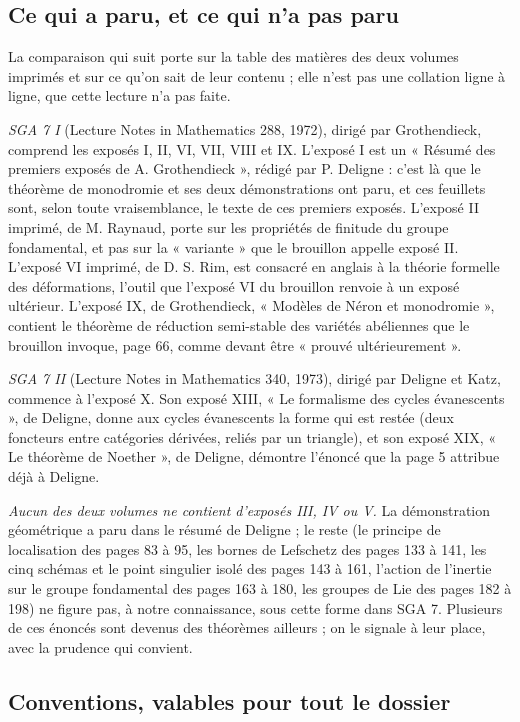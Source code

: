 \documentclass[11pt,a4paper]{article}
\begin{document}
\subsection*{Ce qui a paru, et ce qui n'a pas paru}

La comparaison qui suit porte sur la table des matières des deux volumes
imprimés et sur ce qu'on sait de leur contenu ; elle n'est pas une collation
ligne à ligne, que cette lecture n'a pas faite.

\emph{SGA 7 I} (Lecture Notes in Mathematics 288, 1972), dirigé par
Grothendieck, comprend les exposés I, II, VI, VII, VIII et IX. L'exposé I est un
« Résumé des premiers exposés de A. Grothendieck », rédigé par P. Deligne :
c'est là que le théorème de monodromie et ses deux démonstrations ont paru, et
ces feuillets sont, selon toute vraisemblance, le texte de ces premiers exposés.
L'exposé II imprimé, de M. Raynaud, porte sur les propriétés de finitude du
groupe fondamental, et pas sur la « variante » que le brouillon appelle exposé
II. L'exposé VI imprimé, de D. S. Rim, est consacré en anglais à la théorie
formelle des déformations, l'outil que l'exposé VI du brouillon renvoie à un
exposé ultérieur. L'exposé IX, de Grothendieck, « Modèles de Néron et
monodromie », contient le théorème de réduction semi-stable des variétés
abéliennes que le brouillon invoque, page 66, comme devant être « prouvé
ultérieurement ».

\emph{SGA 7 II} (Lecture Notes in Mathematics 340, 1973), dirigé par Deligne et
Katz, commence à l'exposé X. Son exposé XIII, « Le formalisme des cycles
évanescents », de Deligne, donne aux cycles évanescents la forme qui est restée
(deux foncteurs entre catégories dérivées, reliés par un triangle), et son
exposé XIX, « Le théorème de Noether », de Deligne, démontre l'énoncé que la
page 5 attribue déjà à Deligne.

\emph{Aucun des deux volumes ne contient d'exposés III, IV ou V.} La démonstration
géométrique a paru dans le résumé de Deligne ; le reste (le principe de
localisation des pages 83 à 95, les bornes de Lefschetz des pages 133 à 141, les
cinq schémas et le point singulier isolé des pages 143 à 161, l'action de
l'inertie sur le groupe fondamental des pages 163 à 180, les groupes de Lie des
pages 182 à 198) ne figure pas, à notre connaissance, sous cette forme dans
SGA 7. Plusieurs de ces énoncés sont devenus des théorèmes ailleurs ; on le
signale à leur place, avec la prudence qui convient.

\subsection*{Conventions, valables pour tout le dossier}
\end{document}

